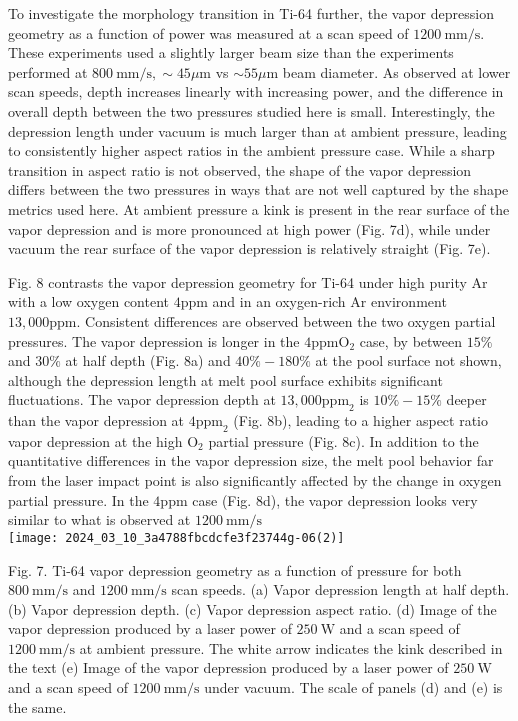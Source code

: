 \documentclass[10pt]{article}
\begin{document}
To investigate the morphology transition in Ti-64 further, the vapor depression geometry as a function of power was measured at a scan speed of $1200 \mathrm{~mm} / \mathrm{s}$. These experiments used a slightly larger beam size than the experiments performed at $800 \mathrm{~mm} / \mathrm{s}, \sim 45 \mu \mathrm{m}$ vs $\sim 55 \mu \mathrm{m}$ beam diameter. As observed at lower scan speeds, depth increases linearly with increasing power, and the difference in overall depth between the two pressures studied here is small. Interestingly, the depression length under vacuum is much larger than at ambient pressure, leading to consistently higher aspect ratios in the ambient pressure case. While a sharp transition in aspect ratio is not observed, the shape of the vapor depression differs between the two pressures in ways that are not well captured by the shape metrics used here. At ambient pressure a kink is present in the rear surface of the vapor depression and is more pronounced at high power (Fig. 7d), while under vacuum the rear surface of the vapor depression is relatively straight (Fig. 7e).

Fig. 8 contrasts the vapor depression geometry for Ti-64 under high purity $\mathrm{Ar}$ with a low oxygen content $4 \mathrm{ppm}$ and in an oxygen-rich $\mathrm{Ar}$ environment $13,000 \mathrm{ppm}$. Consistent differences are observed between the two oxygen partial pressures. The vapor depression is longer in the $4 \mathrm{ppm} \mathrm{O}_{2}$ case, by between $15 \%$ and $30 \%$ at half depth (Fig. 8a) and $40 \%-180 \%$ at the pool surface not shown, although the depression length at melt pool surface exhibits significant fluctuations. The vapor depression depth at $13,000 \mathrm{ppm}_{2}$ is $10 \%-15 \%$ deeper than the vapor depression at $4 \mathrm{ppm}_{2}$ (Fig. 8b), leading to a higher aspect ratio vapor depression at the high $\mathrm{O}_{2}$ partial pressure (Fig. 8c). In addition to the quantitative differences in the vapor depression size, the melt pool behavior far from the laser impact point is also significantly affected by the change in oxygen partial pressure. In the $4 \mathrm{ppm}$ case (Fig. 8d), the vapor depression looks very similar to what is observed at $1200 \mathrm{~mm} / \mathrm{s}$\\
\texttt{[image: 2024\_03\_10\_3a4788fbcdcfe3f23744g-06(2)]}

Fig. 7. Ti-64 vapor depression geometry as a function of pressure for both $800 \mathrm{~mm} / \mathrm{s}$ and $1200 \mathrm{~mm} / \mathrm{s}$ scan speeds. (a) Vapor depression length at half depth. (b) Vapor depression depth. (c) Vapor depression aspect ratio. (d) Image of the vapor depression produced by a laser power of $250 \mathrm{~W}$ and a scan speed of $1200 \mathrm{~mm} / \mathrm{s}$ at ambient pressure. The white arrow indicates the kink described in the text (e) Image of the vapor depression produced by a laser power of $250 \mathrm{~W}$ and a scan speed of $1200 \mathrm{~mm} / \mathrm{s}$ under vacuum. The scale of panels (d) and (e) is the same.
\end{document}
